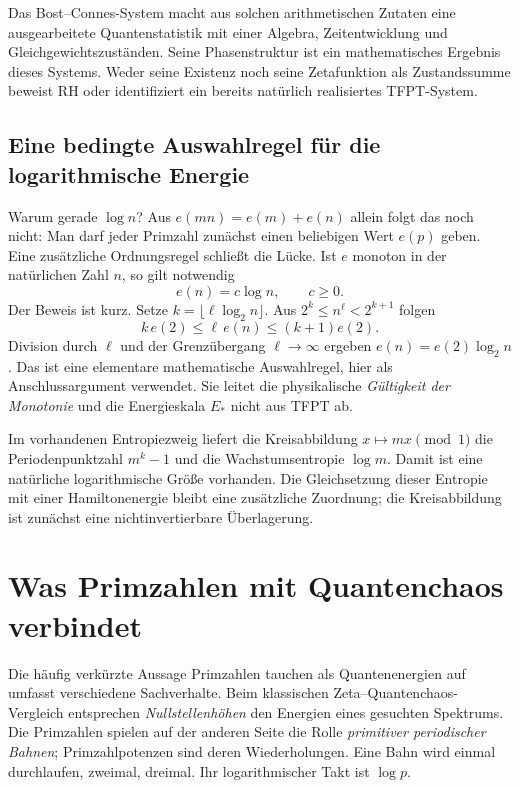 Das Bost--Connes-System macht aus solchen arithmetischen Zutaten eine ausgearbeitete Quantenstatistik mit einer Algebra, Zeitentwicklung und Gleichgewichtszuständen. Seine Phasenstruktur ist ein mathematisches Ergebnis dieses Systems. Weder seine Existenz noch seine Zetafunktion als Zustandssumme beweist RH oder identifiziert ein bereits natürlich realisiertes TFPT-System. 

\subsection{Eine bedingte Auswahlregel für die logarithmische Energie}
Warum gerade $\log n$? Aus $e(mn)=e(m)+e(n)$ allein folgt das noch nicht: Man darf jeder Primzahl zunächst einen beliebigen Wert $e(p)$ geben. Eine zusätzliche Ordnungsregel schließt die Lücke. Ist $e$ monoton in der natürlichen Zahl $n$, so gilt notwendig
\begin{equation}e(n)=c\log n,\qquad c\geq0.\end{equation}
Der Beweis ist kurz. Setze $k=\lfloor\ell\log_2n\rfloor$. Aus $2^k\leq n^\ell<2^{k+1}$ folgen
\[
 k\,e(2)\leq\ell\,e(n)\leq(k+1)e(2).
\]
Division durch $\ell$ und der Grenzübergang $\ell\to\infty$ ergeben $e(n)=e(2)\log_2n$. Das ist eine elementare mathematische Auswahlregel, hier als Anschlussargument verwendet. Sie leitet die physikalische \emph{Gültigkeit der Monotonie} und die Energieskala $E_*$ nicht aus TFPT ab.

Im vorhandenen Entropiezweig liefert die Kreisabbildung $x\mapsto mx\pmod1$ die Periodenpunktzahl $m^k-1$ und die Wachstumsentropie $\log m$. Damit ist eine natürliche logarithmische Größe vorhanden. Die Gleichsetzung dieser Entropie mit einer Hamiltonenergie bleibt eine zusätzliche Zuordnung; die Kreisabbildung ist zunächst eine nichtinvertierbare Überlagerung. 

\section{Was Primzahlen mit Quantenchaos verbindet}
Die häufig verkürzte Aussage \glqq Primzahlen tauchen als Quantenenergien auf\grqq{} umfasst verschiedene Sachverhalte. Beim klassischen Zeta--Quantenchaos-Vergleich entsprechen \emph{Nullstellenhöhen} den Energien eines gesuchten Spektrums. Die Primzahlen spielen auf der anderen Seite die Rolle \emph{primitiver periodischer Bahnen}; Primzahlpotenzen sind deren Wiederholungen. Eine Bahn wird einmal durchlaufen, zweimal, dreimal. Ihr logarithmischer Takt ist $\log p$. 

